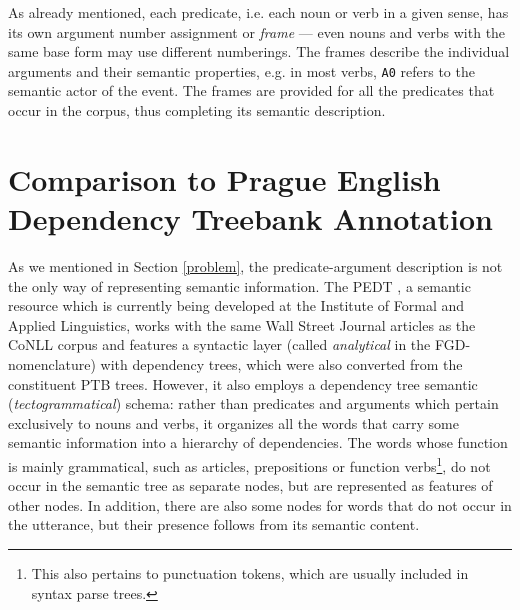 \documentclass[12pt,notitlepage]{report}
\begin{document}
As already mentioned, each predicate, i.e. each noun or verb in a given sense, has its own argument number assignment or \emph{frame} --- even nouns and verbs with the same base form may use different numberings. The frames describe the individual arguments and their semantic properties, e.g. in most verbs, \texttt{A0} refers to the semantic actor of the event. The frames are provided for all the predicates that occur in the corpus, thus completing its semantic description.

\section{Comparison to Prague English Dependency Treebank Annotation}

As we mentioned in Section \ref{problem}, the predicate-argument description is not the only way of representing semantic information. The PEDT \citep{cinkova09}, a semantic resource which is currently being developed at the Institute of Formal and Applied Linguistics, works with the same Wall Street Journal articles as the CoNLL corpus and features a syntactic layer (called \emph{analytical} in the FGD-nomenclature) with dependency trees, which were also converted from the constituent PTB trees. However, it also employs a dependency tree semantic (\emph{tectogrammatical}) schema: rather than predicates and arguments which pertain exclusively to nouns and verbs, it organizes all the words that carry some semantic information into a hierarchy of dependencies. The words whose function is mainly grammatical, such as articles, prepositions or function verbs\footnote{This also pertains to punctuation tokens, which are usually included in syntax parse trees.}, do not occur in the semantic tree as separate nodes, but are represented as features of other nodes. In addition, there are also some nodes for words that do not occur in the utterance, but their presence follows from its semantic content. 
\end{document}
